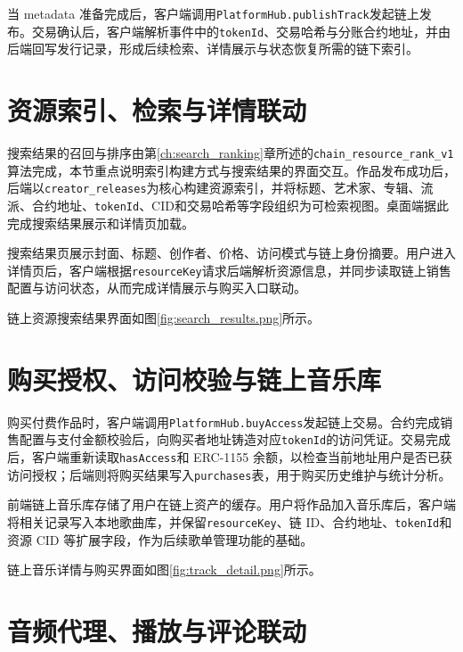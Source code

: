 当 metadata 准备完成后，客户端调用\texttt{PlatformHub.publishTrack}发起链上发布。交易确认后，客户端解析事件中的\texttt{tokenId}、交易哈希与分账合约地址，并由后端回写发行记录，形成后续检索、详情展示与状态恢复所需的链下索引。

\section{资源索引、检索与详情联动}

搜索结果的召回与排序由第\ref{ch:search_ranking}章所述的\texttt{chain\_resource\_rank\_v1}算法完成，本节重点说明索引构建方式与搜索结果的界面交互。作品发布成功后，后端以\texttt{creator\_releases}为核心构建资源索引，并将标题、艺术家、专辑、流派、合约地址、\texttt{tokenId}、CID和交易哈希等字段组织为可检索视图。桌面端据此完成搜索结果展示和详情页加载。

搜索结果页展示封面、标题、创作者、价格、访问模式与链上身份摘要。用户进入详情页后，客户端根据\texttt{resourceKey}请求后端解析资源信息，并同步读取链上销售配置与访问状态，从而完成详情展示与购买入口联动。

链上资源搜索结果界面如图\ref{fig:search_results.png}所示。


\section{购买授权、访问校验与链上音乐库}

购买付费作品时，客户端调用\texttt{PlatformHub.buyAccess}发起链上交易。合约完成销售配置与支付金额校验后，向购买者地址铸造对应\texttt{tokenId}的访问凭证。交易完成后，客户端重新读取\texttt{hasAccess}和 ERC-1155 余额，以检查当前地址用户是否已获访问授权；后端则将购买结果写入\texttt{purchases}表，用于购买历史维护与统计分析。

前端链上音乐库存储了用户在链上资产的缓存。用户将作品加入音乐库后，客户端将相关记录写入本地歌曲库，并保留\texttt{resourceKey}、链 ID、合约地址、\texttt{tokenId}和资源 CID 等扩展字段，作为后续歌单管理功能的基础。

链上音乐详情与购买界面如图\ref{fig:track_detail.png}所示。


\section{音频代理、播放与评论联动}

